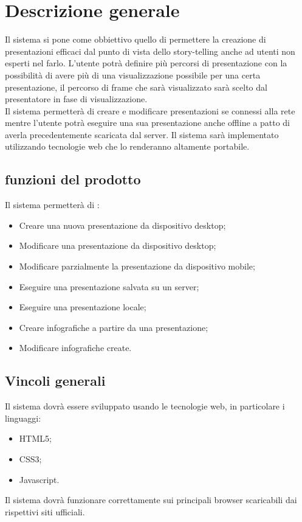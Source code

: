\section{Descrizione generale}{
Il sistema si pone come obbiettivo quello di permettere la creazione di presentazioni efficaci dal punto di vista dello story-telling anche ad utenti non esperti nel farlo.
L'utente potrà definire più percorsi di presentazione con la possibilità di avere più di una visualizzazione possibile per una certa presentazione, il percorso di frame che sarà visualizzato sarà scelto dal presentatore in fase di visualizzazione.\\
Il sistema permetterà di creare e modificare presentazioni se connessi alla rete mentre l'utente potrà eseguire una sua presentazione anche offline a patto di averla precedentemente scaricata dal server.
Il sistema sarà implementato utilizzando tecnologie web che lo renderanno altamente portabile.

\subsection{funzioni del prodotto}{
	Il sistema permetterà di :
	\begin{itemize}
		\item Creare una nuova presentazione da dispositivo desktop;
		\item Modificare una presentazione da dispositivo desktop;
		\item Modificare parzialmente la presentazione da dispositivo mobile;
		\item Eseguire una presentazione salvata su un server;
		\item Eseguire una presentazione locale;
		\item Creare infografiche a partire da una presentazione;
		\item Modificare infografiche create.
	\end{itemize}
}
\subsection{Vincoli generali}{
	Il sistema dovrà essere sviluppato usando le tecnologie web, in particolare i linguaggi:
	\begin{itemize}
		\item HTML5;
		\item CSS3;
		\item Javascript.
	\end{itemize}
	
	\noindent
	Il sistema dovrà funzionare correttamente sui principali browser scaricabili dai rispettivi siti ufficiali.
	}
}